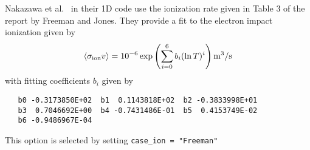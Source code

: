 \documentclass[amsmath,amssymb,a4]{revtex4}
\begin{document}
Nakazawa et al.~\cite{nakazawa2000} in their 1D code use the ionization rate given in Table 3 of the report by Freeman and Jones. They provide a fit to the electron impact ionization given by
\begin{equation}\label{charge_exchange_FJ}
    \langle\sigma_{\rm ion} v\rangle = 10^{-6} \exp\left( \sum_{i=0}^6 b_i (\ln T)^i \right)  {\rm m}^3/{\rm s}
\end{equation}
with fitting coefficients $b_i$ given by
\begin{small}\begin{verbatim}
   b0 -0.3173850E+02  b1  0.1143818E+02  b2 -0.3833998E+01
   b3  0.7046692E+00  b4 -0.7431486E-01  b5  0.4153749E-02
   b6 -0.9486967E-04
\end{verbatim}\end{small}
This option is selected by setting {\tt case\_ion = "Freeman"}
\end{document}
